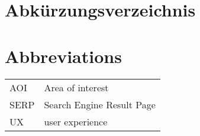 \ifmmtlanguagegerman
\section*{Abkürzungsverzeichnis}
\else
\section*{Abbreviations}
\fi

\begin{table}[h]		
	\begin{tabular}{ll}
	    AOI & Area of interest \\
		SERP & Search Engine Result Page \\
		UX & user experience \\
	\end{tabular}
\end{table}
